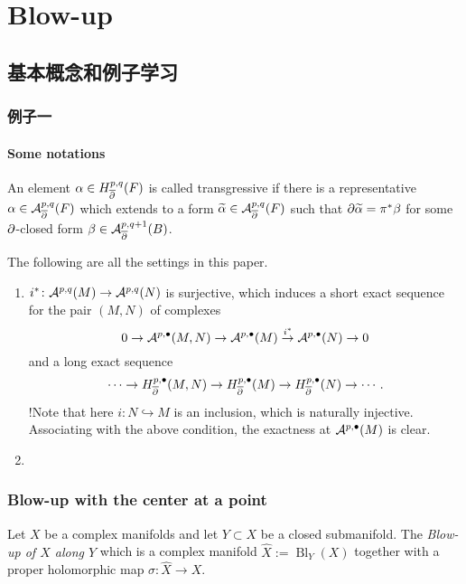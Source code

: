 \chapter{Blow-up}
\section{基本概念和例子学习}
\subsection{例子一}
\subsubsection{Some notations}

\begin{definition}[][transgressive]
    An element $\alpha\in H^{p,q}_{\overline{\partial}}(F)$  is called transgressive if there is a representative $\alpha\in {\mathcal A}^{p,q}_{\overline{\partial}}(F)$ which extends to a form $\widetilde{\alpha}\in {\mathcal A}^{p,q}_{\overline{\partial}}(F)$ such that $\partial\widetilde{\alpha}=\pi^*\beta$ for some $\partial$-closed form $\beta\in {\mathcal A}^{p,q+1}_{\overline{\partial}}(B)$.
\end{definition}

The following are all the settings in this paper.
\begin{enumerate}
    \item $i^*\colon {\mathcal A}^{p,q}(M)\to{\mathcal A}^{p,q}(N)$ is surjective, which induces a short exact sequence for the pair $(M,N)$ of complexes 
    \[
        0\to{\mathcal A}^{p,\bullet}(M,N)\to {\mathcal A}^{p,\bullet}(M)\stackrel{i^*}{\to}{\mathcal A}^{p,\bullet}(N)\to 0
    \]
     and a long exact sequence
     \[
        \cdots\to H^{p,\bullet}_{\overline{\partial}} (M,N)\to H^{p,\bullet}_{\overline{\partial}} (M) \to H^{p,\bullet}_{\overline{\partial}} (N)\to \cdots.
     \]
     !Note that here $i\colon N\hookrightarrow M$ is an inclusion, which is naturally injective. Associating with the above condition, the exactness at ${\mathcal A}^{p,\bullet}(M)$ is clear.
    \item 
\end{enumerate}

\subsection{Blow-up with the center at a point}

\begin{definition}[][Blow-up]
    Let $X$ be a complex manifolds and let $Y\subset X$ be a closed submanifold. The \textit{Blow-up of $X$ along $Y$} which is a complex manifold $\widehat{X}:=\operatorname{Bl}_Y (X)$ together with a proper holomorphic map $\sigma\colon \widehat{X}\to X$.
\end{definition}


